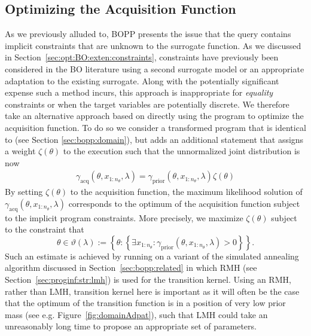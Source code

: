 
\subsection{Optimizing the Acquisition Function}
\label{sec:optacqfunc}

As we previously alluded to, BOPP presents the issue that the query contains implicit constraints that are unknown to the surrogate function.  As we discussed in 
Section~\ref{sec:opt:BO:exten:constraints}, constraints have previously been considered
in the BO literature using a second surrogate model or an appropriate adaptation to the
existing surrogate.  Along with the potentially significant expense such a method incurs, this approach is inappropriate for \emph{equality} constraints or when the target variables are potentially discrete.  We therefore take an alternative approach based on directly using the program to optimize the acquisition function.  To do so we consider a transformed program  that is identical to  (see Section \ref{sec:bopp:domain}), but adds an additional \observe statement that assigns a weight $\zeta(\theta)$ to the execution such that the unnormalized joint distribution is now 
\begin{align}
\label{eq:bopp:qacq}
\gamma_{\text{acq}}(\theta,x_{1:n_{\theta}},\lambda) = \gamma_{\text{prior}}(\theta,x_{1:n_{\theta}},\lambda) \zeta(\theta)
\end{align}
By setting $\zeta(\theta)$ to the acquisition function, the maximum likelihood solution 
of $\gamma_{\text{acq}}(\theta,x_{1:n_{\theta}},\lambda)$ corresponds to the optimum of the acquisition function 
subject to the implicit program constraints.  More precisely, we maximize $\zeta(\theta)$ subject to
the constraint that
\[
\theta \in \vartheta(\lambda) := \left\{\theta : \left\{\exists x_{1:n_{\theta}} :
 \gamma_{\text{prior}}(\theta,x_{1:n_{\theta}},\lambda)>0\right\} \right\}.
\]
Such an estimate is achieved by running on \qacq a variant of the simulated annealing algorithm 
discussed in Section~\ref{sec:bopp:related} in which RMH (see Section~\ref{sec:proginf:str:lmh}) is used for
the transition kernel.  Using an RMH, rather than LMH, transition kernel here is important as it will often
be the case that the optimum of the transition function is in a position of very low prior mass (see e.g. Figure~\ref{fig:domainAdpat}),
such that LMH could take an unreasonably long time to propose an appropriate set of parameters.

